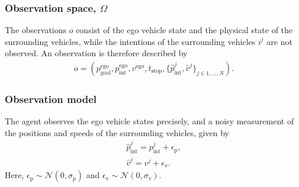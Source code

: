 	
	\subsubsection{Observation space, $\Omega$}
	The observations $o$ consist of the ego vehicle state and the physical state of the surrounding vehicles, while the intentions of the surrounding vehicles $i^j$ are not observed. An observation is therefore described by
	\begin{align}
		o = (p^\mathrm{ego}_\mathrm{goal},p^\mathrm{ego}_\mathrm{int}, v^\mathrm{ego}, t_\mathrm{stop}, \{\hat{p}^{j}_\mathrm{int}, \hat{v}^j\}_{j\in1,\dots,N}).
	\end{align}
	
	\subsubsection{Observation model}
	
	
	
	The agent observes the ego vehicle states precisely, and a noisy measurement of the positions and speeds of the surrounding vehicles, given by
	\begin{align}
		\label{eq:noise_pos}
		\hat{p}^{j}_\mathrm{int} = p^{j}_\mathrm{int} + \epsilon_\mathrm{p},\\ 
		\hat{v}^j = v^j + \epsilon_\mathrm{v}.
		\label{eq:noise_vel}
	\end{align}
	Here, $\epsilon_\mathrm{p} \sim \mathcal{N}(0, \sigma_p)$ and $\epsilon_\mathrm{v} \sim \mathcal{N}(0, \sigma_v)$.
	

